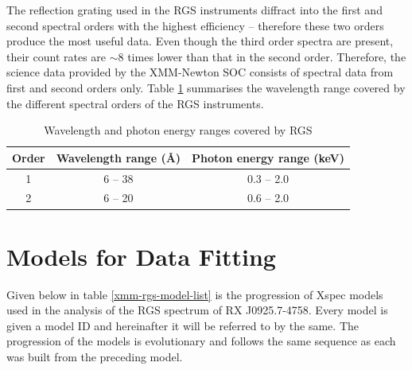		The reflection grating used in the RGS instruments diffract into the first and second spectral orders with the highest efficiency -- therefore these two orders produce the most useful data. Even though the third order spectra are present, their count rates are $\sim 8$ times lower than that in the second order. Therefore, the science data provided by the XMM-Newton SOC consists of spectral data from first and second orders only. Table \ref{xmm-rgs-wavelength} summarises the wavelength range covered by the different spectral orders of the RGS instruments.
		\begin{table}[!htb]
			\centering
			\caption{Wavelength and photon energy ranges covered by RGS}
			\label{xmm-rgs-wavelength}
			\begin{tabular}{ccc}
				\hline
				{\textbf{Order}} & {\textbf{Wavelength range (\AA)}} & {\textbf{Photon energy range (keV)}} \\
				\hline
				{1} & {6 -- 38} & {0.3 -- 2.0} \\
				{2} & {6 -- 20} & {0.6 -- 2.0} \\
				\hline
			\end{tabular}
		\end{table}
	
	\section{Models for Data Fitting} \label{hi-resolution:models}
		Given below in table \ref{xmm-rgs-model-list} is the progression of Xspec models used in the analysis of the RGS spectrum of RX J0925.7-4758. Every model is given a model ID and hereinafter it will be referred to by the same. The progression of the models is evolutionary and follows the same sequence as each was built from the preceding model.
		
